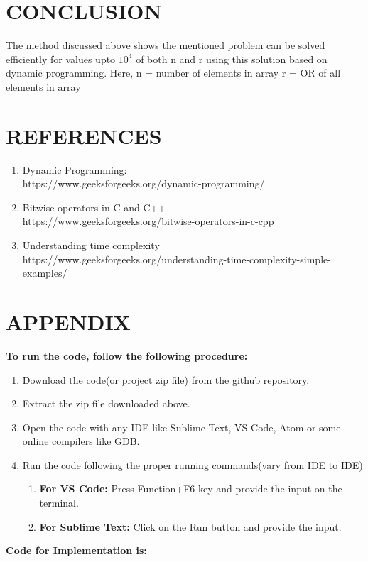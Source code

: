 \documentclass[10pt]{article}
\begin{document}
\begin{multicols*}{2}
\section*{CONCLUSION}

The method discussed above shows the mentioned problem can be solved efficiently for values upto \(10^4\)  of both  n and r using this solution based on dynamic programming.
Here,   n = number of elements in array
r = OR of all elements in array 



\section*{REFERENCES}

\begin{enumerate}
\item Dynamic Programming:\\
https://www.geeksforgeeks.org/dynamic-programming/
\item Bitwise operators in C and C++\\
https://www.geeksforgeeks.org/bitwise-operators-in-c-cpp
\item Understanding time complexity\\
https://www.geeksforgeeks.org/understanding-time-complexity-simple-examples/
\end{enumerate}

\section*{APPENDIX}
\textbf{To run the code, follow the following procedure:}
\begin{enumerate}
    \item Download the code(or project zip file) from the github repository.
    \item Extract the zip file downloaded above.
    \item Open the code with any IDE like Sublime Text, VS Code, Atom or some online compilers like GDB.
    \item Run the code following the proper running commands(vary from IDE to IDE)
    \begin{enumerate}
        \item \textbf{For VS Code:} Press Function+F6 key and provide the input on the terminal.
        \item \textbf{For Sublime Text:} Click on the Run button and provide the input.\\
    \end{enumerate}
\end{enumerate}
\textbf{Code for Implementation is:}


\end{multicols*}
\end{document}
